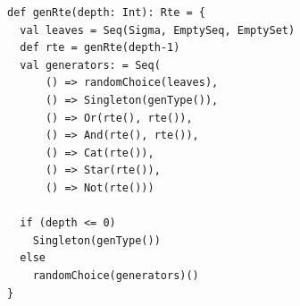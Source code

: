 
\begin{lstlisting}[style=scalaioScala]
def genRte(depth: Int): Rte = {
  val leaves = Seq(Sigma, EmptySeq, EmptySet)
  def rte = genRte(depth-1)
  val generators: = Seq(
      () => randomChoice(leaves),
      () => Singleton(genType()),
      () => Or(rte(), rte()),
      () => And(rte(), rte()),
      () => Cat(rte()),
      () => Star(rte()),
      () => Not(rte()))

  if (depth <= 0)
    Singleton(genType())
  else
    randomChoice(generators)()
}
\end{lstlisting}
